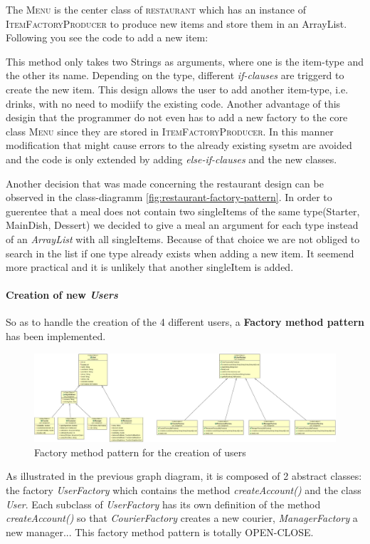 The \textsc{Menu} is the center class of \textsc{restaurant} which has an instance of 
\textsc{ItemFactoryProducer} to produce new items and store them in an ArrayList. Following you
see the code to add a new item:


This method only takes two Strings as arguments, where one is the item-type and the other its
name. Depending on the type, different \textit{if-clauses} are triggerd to create the new item.
This design allows the user to add another item-type, i.e. drinks, with no need to modiify the
existing code. Another advantage of this desigin that the programmer do not even has to add a new
factory to the core class \textsc{Menu} since they are stored in \textsc{ItemFactoryProducer}. In
this manner modification that might cause errors to the already existing sysetm are avoided and
the code is only extended by adding \textit{else-if-clauses} and the new classes. 

Another decision that was made concerning the restaurant design can be observed in the
class-diagramm \ref{fig:restaurant-factory-pattern}. In order to guerentee that a meal does not
contain two singleItems of the same type(Starter, MainDish, Dessert) we decided to give a meal an
argument for each type instead of an \textit{ArrayList} with all singleItems. Because of that
choice we are not obliged to search in the list if one type already exists when adding a new item.
It seemend more practical and it is unlikely that another singleItem is added.

\paragraph{Creation of new \textit{Users}}
So as to handle the creation of the 4 different users, a \textbf{Factory method pattern} has been implemented.
\begin{figure}[H]
	\centering
	\includegraphics[width=1\linewidth]{./ima/userFactory.jpg}
	\caption{Factory method pattern for the creation of users}
	\label{fig:./ima/userFactory}
\end{figure}
As illustrated in the previous graph diagram, it is composed of 2 abstract classes: the factory \textit{UserFactory} which contains the method \textit{createAccount()} and the class \textit{User}. Each subclass of \textit{UserFactory} has its own definition of the method \textit{createAccount()} so that \textit{CourierFactory} creates a new courier, \textit{ManagerFactory} a new manager... This factory method pattern is totally OPEN-CLOSE.
